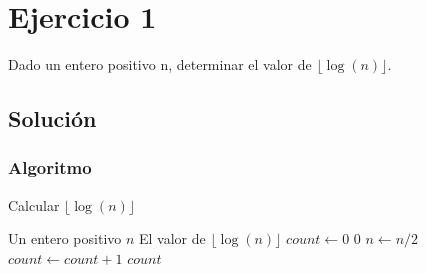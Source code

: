 \section{Ejercicio 1}
Dado un entero positivo n, determinar el valor de $\lfloor\log(n)\rfloor$.

\subsection*{Solución}
\subsubsection*{Algoritmo}
\begin{algorithm}[H]
\caption{Calcular $\lfloor\log(n)\rfloor$}
\begin{algorithmic}[1]
\REQUIRE Un entero positivo $n$
\ENSURE El valor de $\lfloor\log(n)\rfloor$
\STATE $count \gets 0$
    \RETURN $0$
\ENDIF
{}
    \STATE $n \gets n/2$
    \STATE $count \gets count + 1$
\ENDWHILE
\RETURN $count$
\end{algorithmic}
\end{algorithm}

